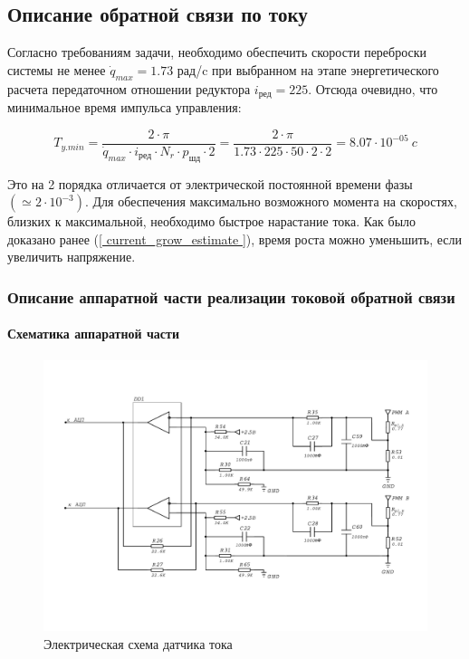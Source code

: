 \newpage
\subsection{ Описание обратной связи по току }
Согласно требованиям задачи, необходимо обеспечить скорости переброски системы не менее
$ \dot{q}_{max} = 1.73 $ рад/c при выбранном на этапе энергетического расчета передаточном
отношении редуктора $ i_\text{ред} = 225 $. Отсюда очевидно, что минимальное время импульса управления:

$$
    T_{y.min} = \frac{ 2 \cdot \pi }{ \dot{q}_{max} \cdot i_\text{ред} \cdot N_{r} \cdot p_{\text{шд}} \cdot 2 }
    = \frac{ 2 \cdot \pi }{ 1.73 \cdot 225 \cdot 50 \cdot 2 \cdot 2 }
    = 8.07 \cdot 10^{-05} ~c
$$

Это на 2 порядка отличается от электрической постоянной времени фазы $( \simeq2 \cdot 10^{-3} )$.
Для обеспечения максимально возможного момента на скоростях, близких к максимальной, необходимо
быстрое нарастание тока. Как было доказано ранее (\ref{ current_grow_estimate }), время роста можно
уменьшить, если увеличить напряжение.

\subsubsection{ Описание аппаратной части реализации токовой обратной связи }

\paragraph{ Схематика аппаратной части }

\begin{figure}[ht!]
    \centering
    \includegraphics[width=\textwidth, keepaspectratio, clip=true, trim=0mm 25mm 0mm 25mm]
                    {./src/pictures/current_measuring_sheme}
    \caption{Электрическая схема датчика тока}
    \label{pic_current_measuring_sheme}
\end{figure}

